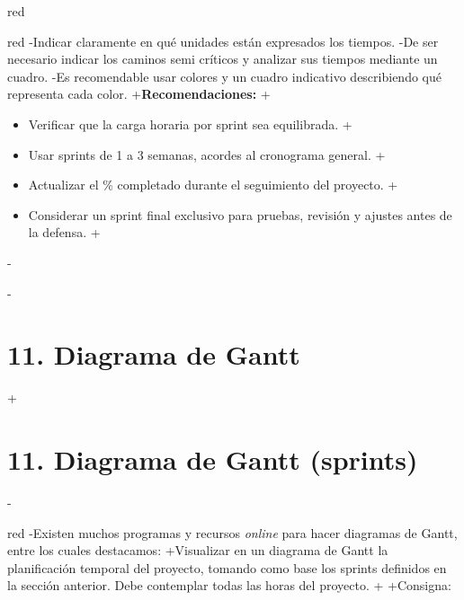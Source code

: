 \documentclass[
 11pt, %
-%
+codirector, %
 ]{charter}
\begin{document}
\begin{table}[ht]
\begin{table}[ht]
\begin{consigna}{red}
\begin{consigna}{red}
-Indicar claramente en qué unidades están expresados los tiempos.
-De ser necesario indicar los caminos semi críticos y analizar sus tiempos mediante un cuadro.
-Es recomendable usar colores y un cuadro indicativo describiendo qué representa cada color.
+\textbf{Recomendaciones:}
+\begin{itemize}
+  \item Verificar que la carga horaria por sprint sea equilibrada.
+  \item Usar sprints de 1 a 3 semanas, acordes al cronograma general.
+  \item Actualizar el \% completado durante el seguimiento del proyecto.
+  \item Considerar un sprint final exclusivo para pruebas, revisión y ajustes antes de la defensa.
+\end{itemize}
 
-\end{consigna}
 
-\section{11. Diagrama de Gantt}
+\section{11. Diagrama de Gantt (sprints)}
 \label{sec:gantt}
 
-\begin{consigna}{red}
-Existen muchos programas y recursos \textit{online} para hacer diagramas de Gantt, entre los cuales destacamos:
+Visualizar en un diagrama de Gantt la planificación temporal del proyecto, tomando como base los sprints definidos en la sección anterior. Debe contemplar todas las horas del proyecto.
+
+Consigna:
 

\end{consigna}
\end{consigna}
\end{table}
\end{table}
\end{document}
